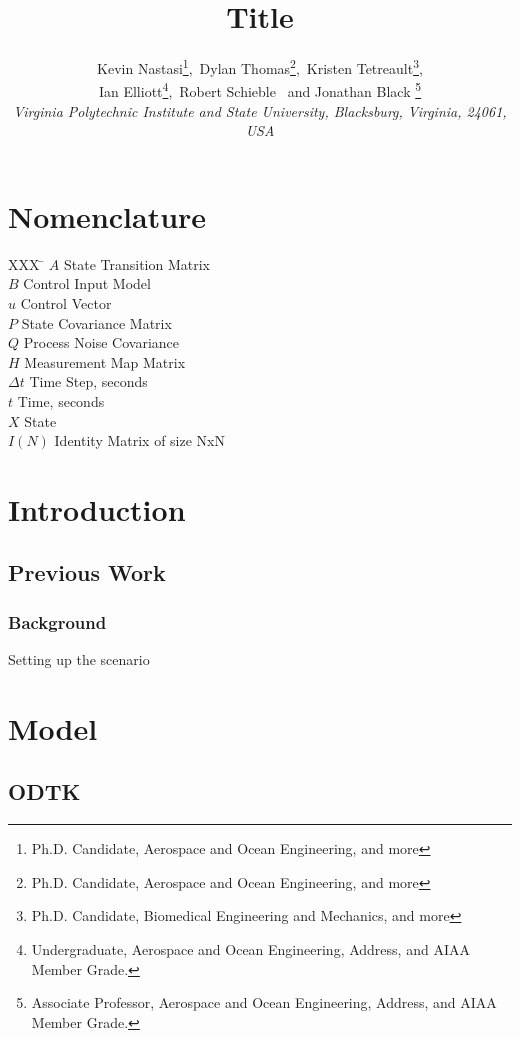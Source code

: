 \documentclass[]{aiaa-tc}%
\title{Title}
\author{
  Kevin Nastasi\thanks{Ph.D. Candidate, Aerospace and Ocean Engineering, and more},\ 
    Dylan Thomas\thanks{Ph.D. Candidate, Aerospace and Ocean Engineering, and more},\ 
    Kristen Tetreault\thanks{Ph.D. Candidate, Biomedical Engineering and Mechanics, and more},\\ 
    Ian Elliott\thanks{Undergraduate, Aerospace and Ocean Engineering, Address, and AIAA Member Grade.},\ 
    Robert Schieble\thanksibid{4} \ and 
    Jonathan Black \thanks{Associate Professor, Aerospace and Ocean Engineering, Address, and AIAA Member Grade.}\\
  {\normalsize\itshape
   Virginia Polytechnic Institute and State University, Blacksburg, Virginia, 24061, USA}\\
 }
\begin{document}
\maketitle

\begin{abstract}
\end{abstract}

\section*{Nomenclature}

\begin{tabbing}
  XXX \= \kill%
  $A$ \> State Transition Matrix \\
  $B$ \> Control Input Model \\
  $u$ \> Control Vector \\
  $P$ \> State Covariance Matrix \\
  $Q$ \> Process Noise Covariance \\
  $H$ \> Measurement Map Matrix \\
  $\Delta t$ \> Time Step, seconds \\
  $t$ \> Time, seconds \\
  $X$ \> State \\
  $I(N)$ \> Identity Matrix of size NxN
 \end{tabbing}

\section{Introduction}

\subsection{Previous Work}

\subsubsection{Background}

Setting up the scenario

\section{Model}


\subsection{ODTK}
\end{document}
